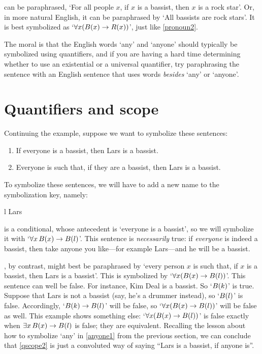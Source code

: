  can be paraphrased, `For all people $x$, if $x$ is a bassist, then $x$ is a rock star'. Or, in more natural English, it can be paraphrased by `All bassists are rock stars'. It is best symbolized as `$\forall x(B(x) \rightarrow R(x))$', just like \cref*{pronoun2}.

The moral is that the English words `any' and `anyone' should typically be symbolized using quantifiers, and if you are having a hard time determining whether to use an existential or a universal quantifier, try paraphrasing the sentence with an English sentence that uses words \emph{besides} `any' or `anyone'.



\section{Quantifiers and scope}
Continuing the example, suppose we want to symbolize these sentences:
	\begin{enumerate}
		\item\label{qscope1} If everyone is a bassist, then Lars is a bassist.
		\item\label{qscope2} Everyone is such that, if they are a bassist, then Lars is a bassist.
	\end{enumerate}
To symbolize these sentences, we will have to add a new name to the symbolization key, namely:
	\begin{ekey}
		\item[l] Lars
	\end{ekey}
 is a conditional, whose antecedent is `everyone is a bassist', so we will symbolize it with `$\forall x\, B(x) \rightarrow B(l)$'. This sentence is \emph{necessarily} true: if \emph{everyone} is indeed a bassist, then take anyone you like---for example Lars---and he will be a bassist.

, by contrast, might best be paraphrased by `every
person $x$ is such that, if $x$ is a bassist, then Lars is a bassist'.
This is symbolized by `$\forall x (B(x) \rightarrow B(l))$'.
This sentence can well be false. For instance, Kim Deal is a bassist.
So `$B(k)$' is true. Suppose that Lars is not a bassist (say,
he's a drummer instead), so `$B(l)$' is false. Accordingly,
`$B(k) \rightarrow B(l)$' will be false, so `$\forall x
(B(x) \rightarrow B(l))$' will be false as well. This example
shows something else: `$\forall x (B(x) \rightarrow B(l))$' is
false exactly when $\exists x\,B(x) \rightarrow B(l)$ is false;
they are equivalent. Recalling the lesson about how to symbolize `any'
in \cref{anyone1} from the previous section, we can conclude that
\cref*{qscope2} is just a convoluted way of saying ``Lars is a bassist,
if anyone is''.

